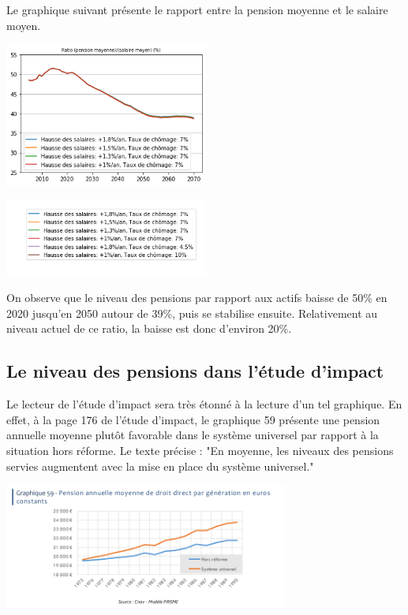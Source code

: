 \documentclass[10pt]{article}
\begin{document}
Le graphique suivant présente le rapport entre la pension moyenne et le salaire moyen. 

\begin{center}
\includegraphics[width=0.5\textwidth]{Simulation-P.png}

\includegraphics[width=0.5\textwidth]{Simulation-legende.png}
\end{center}

On observe que le niveau des pensions par rapport aux actifs 
baisse de 50\% en 2020 jusqu'en 2050 autour de 39\%, puis se stabilise ensuite. 
Relativement au niveau actuel de ce ratio, la baisse est donc d'environ 20\%. 


\subsection{Le niveau des pensions dans l'étude d'impact}

Le lecteur de l'étude d'impact sera très étonné à la lecture d'un 
tel graphique. 
En effet, à la page 176 de l'étude d'impact, le graphique 59 présente 
une pension annuelle moyenne plutôt favorable dans le système 
universel par rapport à la situation hors réforme. 
Le texte précise : "En moyenne, les niveaux des pensions servies augmentent 
avec la mise en place du système universel."

\begin{center}
\includegraphics[width=0.7\textwidth]{EtudeImpact-PensionAnnuelle.png}
\end{center}
\end{document}
